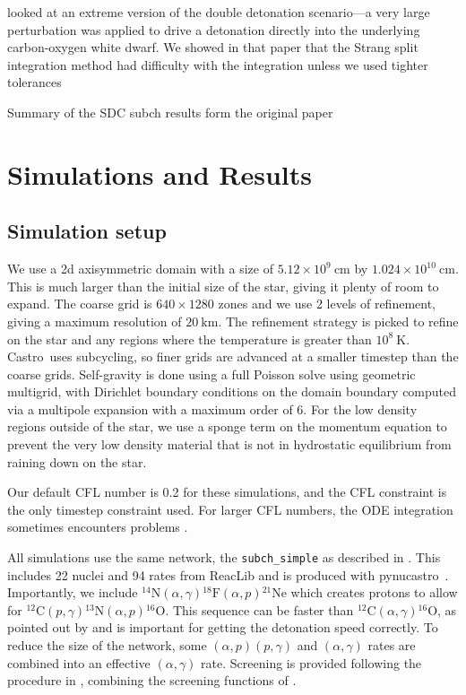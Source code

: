 \documentclass[modern]{aastex631}
\newcommand{\isotm}[2]{{}^{#2}\mathrm{#1}}
\newcommand{\castro}{{\sf Castro}}
\newcommand{\pynucastro}{{\sf pynucastro}}
\newcommand{\MarginPar}[1]{
    \marginpar{\vskip-\baselineskip%
               \raggedright%
               \tiny\sffamily%
               {\color{red}\hrule%
               \smallskip%
               #1\par%
               \smallskip%
               \hrule}}%
}
\begin{document}
\citet{castro_simple_sdc} looked at an extreme version of the
double detonation scenario---a very large perturbation was applied
to drive a detonation directly into the underlying
carbon-oxygen white dwarf.  We showed in that paper that the Strang
split integration method had difficulty with the integration unless
we used tighter tolerances

Summary of the SDC subch results form the original paper

\section{Simulations and Results}\label{Sec:results}

\subsection{Simulation setup}

We use a 2d axisymmetric domain with a size of $5.12\times 10^9~\mathrm{cm}$ by $1.024\times 10^{10}~\mathrm{cm}$.  This is
much larger than the initial size of the star, giving it plenty of
room to expand.  The coarse grid is $640\times 1280$ zones and we use
2 levels of refinement, giving a maximum resolution of
$20~\mathrm{km}$.  The refinement strategy is picked to refine on the
star and any regions where the temperature is greater than
$10^8~\mathrm{K}$.  \castro\ uses subcycling, so finer grids are
advanced at a smaller timestep than the coarse grids.  Self-gravity is
done using a full Poisson solve using geometric multigrid, with
Dirichlet boundary conditions on the domain boundary computed via a
multipole expansion with a maximum order of 6.  For the low density
regions outside of the star, we use a sponge term on the momentum
equation to prevent the very low density material that is not in
hydrostatic equilibrium from raining down on the star.

Our default CFL number is 0.2 for these simulations, and the CFL constraint
is the only timestep constraint used.  For larger CFL numbers, the ODE integration
sometimes encounters problems \MarginPar{more}.

All simulations use the same network, the {\tt subch\_simple} as
described in \cite{zhi2023}.  This includes 22 nuclei and 94 rates
from ReacLib \citep{reaclib} and is produced with \pynucastro\
\citep{pynucastro2}.  Importantly, we include
$\isotm{N}{14}(\alpha,\gamma)\isotm{F}{18}(\alpha,p)\isotm{Ne}{21}$
which creates protons to allow for
$\isotm{C}{12}(p,\gamma)\isotm{N}{13}(\alpha,p)\isotm{O}{16}$.  This
sequence can be faster than
$\isotm{C}{12}(\alpha,\gamma)\isotm{O}{16}$, as pointed out by
\citet{shenbildsten} and is important for getting the detonation speed
correctly.  To reduce the size of the network, some
$(\alpha,p)(p,\gamma)$ and $(\alpha,\gamma)$ rates are combined into
an effective $(\alpha,\gamma)$ rate.  Screening is provided following
the procedure in \citet{wallace:1982}, combining the screening
functions of \citet{graboske:1973,alastuey:1978,itoh:1979}.
\end{document}
